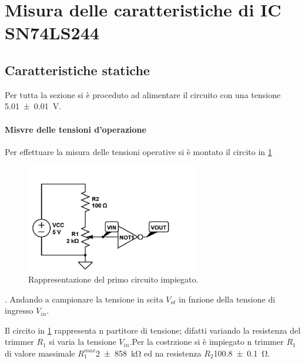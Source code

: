 \section{Misura delle caratteristiche di IC SN74LS244 }
\subsection{Caratteristiche statiche}
	Per tutta la sezione si è proceduto ad alimentare il circuito con una tensione 
	\SI{5.01 \pm 0.01}{\volt}.
	\paragraph{Misvre delle tensioni d'operazione}
	Per effettuare la misura delle tensioni operative si 
	è montato il circito in \figurename{ \ref{f:c1}}
		\begin{figure}[h]
			\includegraphics[scale=1.0]{../immagine/immagine1.png}
			\caption{Rappresentazione del primo circuito impiegato.}
			\label{f:c1}
		\end{figure} .
	Andando a campionare la tensione in scita $V_{ot}$ in fnzione della tensione di ingresso  $V_{in}$.
	
	Il circito in  \figurename{ \ref{f:c1}} rappresenta n partitore di tensione;
		difatti variando la resistenza del trimmer $R_{1}$ si varia la tensione $V_{in}$.Per la costrzione si è impiegato n trimmer $R_{1}$ di valore massimale $R_{1}^{max}$\SI{2 \pm 858}{\kilo \ohm} ed na resistenza $R_{2}$\SI{100.8 \pm 0.1 }{ \ohm}.
		
